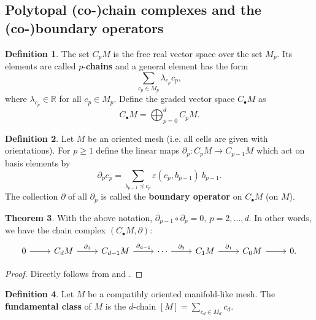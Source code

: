 \documentclass{elsarticle}
\theoremstyle{definition}
\newtheorem{theorem}{Theorem}[section]
\newtheorem{definition}[theorem]{Definition}
\newcommand{\R}{\mathbb{R}} %
\begin{document}
\subsection{Polytopal (co-)chain complexes and the (co-)boundary operators}
\label{sec:complexes}
\begin{definition}
\label{thm:mesh_chain_complex}
  The set $C_{p} M$ is the free real vector space over the set $M_{p}$. Its elements are called $p$-\textbf{chains} and a general element has the form
  \begin{equation}
    \sum_{c_p \in M_p} \lambda_{c_p} c_{p},
  \end{equation}
  where $\lambda_{c_p} \in \R$ for all $c_p \in M_p$.
  Define the graded vector space $C_{\bullet} M$ as
  \begin{equation}
    C_\bullet M = \bigoplus_{p = 0}^{d} C_{p} M.
  \end{equation}
\end{definition}
\begin{definition}
\label{thm:boundary_operator}
  Let $M$ be an oriented mesh (i.e. all cells are given with orientations). For $p \geq 1$ define the linear maps $\partial_{p} \colon C_p M \to C_{p - 1} M$ which act on basis elements by
  \begin{equation}
    \partial_p c_p = \sum_{b_{p - 1} \preceq c_p} \varepsilon(c_p, b_{p - 1})\ b_{p - 1}.
  \end{equation}
  The collection $\partial$ of all $\partial_p$ is called the \textbf{boundary operator} on $C_\bullet M$ (on $M$).
\end{definition}
\begin{theorem}
  With the above notation, $\partial_{p - 1} \circ \partial_p = 0,\ p = 2, ..., d.$ In other words, we have the chain complex $(C_\bullet M, \partial)$:
  \begin{equation}
    \begin{tikzcd}
      0 \arrow[r, ""] &
      C_d M \arrow[r, "\partial_d"] &
      C_{d - 1} M \arrow[r, "\partial_{d - 1}"] &
      \cdots \arrow[r, "\partial_2"] &
      C_1 M \arrow[r, "\partial_1"] &
      C_0 M \arrow[r, ""] &
      0.
    \end{tikzcd}
  \end{equation}
\end{theorem}
\begin{proof}
  Directly follows from  and .
\end{proof}
\begin{definition}
\label{thm:fundamental_class}
  Let $M$ be a compatibly oriented manifold-like mesh. The \textbf{fundamental class} of $M$ is the $d$-chain
  $[M] = \sum_{c_d \in M_d} c_d$.
\end{definition}
\end{document}
